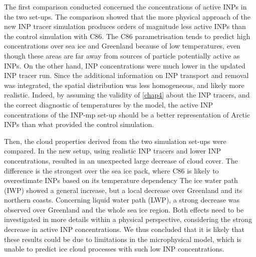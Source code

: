 
The first comparison conducted concerned the concentrations of active INPs in the two set-ups.
The comparison showed that the more physical approach of the new INP tracer simulation produces orders of magnitude less active INPs than the control simulation with C86.
The C86 parametrisation tends to predict high concentrations over sea ice and Greenland because of low temperatures, even though these areas are far away from sources of particle potentially active as INPs.
On the other hand, INP concentrations were much lower in the updated INP tracer run. Since the additional information on INP transport and removal was integrated, the spatial distribution was less homogeneous, and likely more realistic.
Indeed, by assuming the validity of \cref{chap4} about the INP tracers, and the correct diagnostic of temperatures by the model, the active INP concentrations of the INP-mp set-up should be a better representation of Arctic INPs than what provided the control simulation.

Then, the cloud properties derived from the two simulation set-ups were compared.
In the new setup, using realistic INP tracers and lower INP concentrations, resulted in an unexpected large decrease of cloud cover.
The difference is the strongest over the sea ice pack, where C86 is likely to overestimate INPs based on its temperature dependency
The ice water path (IWP) showed a general increase, but a local decrease over Greenland and its northern coasts.
Concerning liquid water path (LWP), a strong decrease was observed over Greenland and the whole sea ice region.
Both effects need to be investigated in more details within a physical perspective, considering the strong decrease in active INP concentrations. We thus concluded that it is likely that these results could be due to limitations in the microphysical model, which is unable to predict ice cloud processes with such low INP concentrations.

